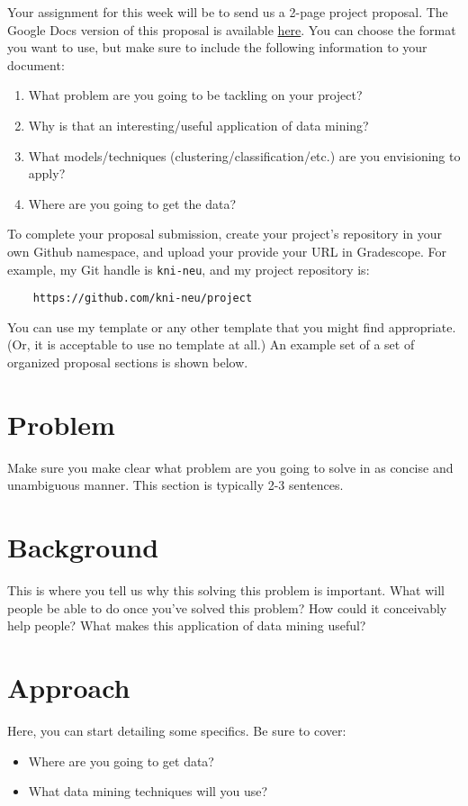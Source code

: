 \documentclass[paper=a4, fontsize=11pt]{scrartcl} %
\author{
    \textbf{YOUR NAME} \\ 
    \textbf{YOUR GIT USERNAME} \\ 
    \textbf{YOUR E-MAIL}
}%
\begin{document}
\maketitle %


Your assignment for this week will be to send us a 2-page project proposal. The Google Docs version of this proposal is available \href{https://docs.google.com/document/d/14Mr8ed5dXt-zEOOucCBdzhDnmKYgnMIx}{here}. You can choose the format you want to use, but make sure to include the following information to your document:

\begin{enumerate}
    \item What problem are you going to be tackling on your project?
    \item Why is that an interesting/useful application of data mining?
    \item What models/techniques (clustering/classification/etc.) are you envisioning to apply?
    \item Where are you going to get the data?
\end{enumerate}

To complete your proposal submission, create your project's repository in your own Github namespace, and upload your provide your URL in Gradescope. For example, my Git handle is \verb"kni-neu", and my project repository is:

\begin{verbatim}
    https://github.com/kni-neu/project
\end{verbatim}

You can use my template or any other template that you might find appropriate. (Or, it is acceptable to use no template at all.) An example set of a set of organized proposal sections is shown below.

\section{Problem}
Make sure you make clear what problem are you going to solve in as concise and unambiguous manner. This section is typically 2-3 sentences.

\section{Background} 
This is where you tell us why this solving this problem is important. What will people be able to do once you've solved this problem? How could it conceivably help people? What makes this application of data mining  useful?

\section{Approach}

Here, you can start detailing some specifics. Be sure to cover:

\begin{itemize}
    \item Where are you going to get data? 
    \item What data mining techniques will you use?
\end{itemize}
\end{document}
